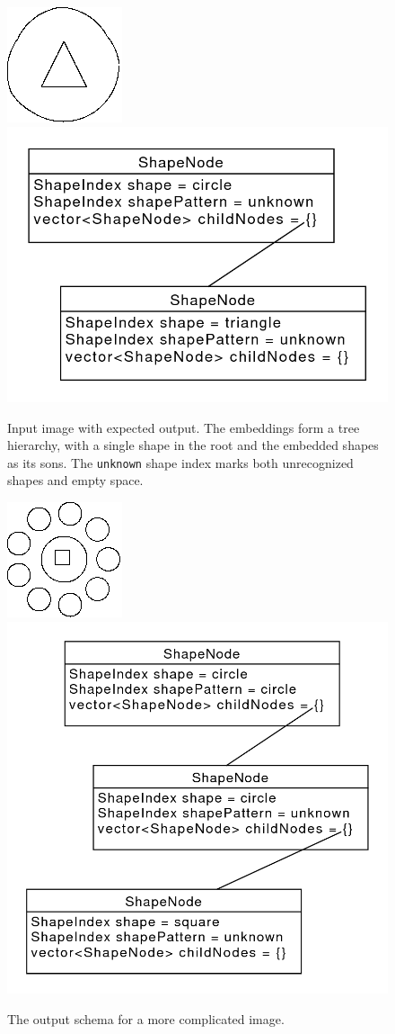 \begin{description}
\begin{figure}[p]
\centering
\includegraphics[width=.3\linewidth]{ext/images/example_output0.png}
\quad
\includegraphics[width=.3\linewidth]{ext/images/example_output0a.png}
\caption{Input image with expected output. The embeddings form a tree hierarchy, with a single shape in the root and the embedded shapes as its sons. The \texttt{unknown} shape index marks both unrecognized shapes and empty space.}
\label{fig:output0}
\end{figure}

\begin{figure}[p]
\centering
\includegraphics[width=.3\linewidth]{ext/images/example_output1.png}
\quad
\includegraphics[width=.3\linewidth]{ext/images/example_output1a.png}
\caption{The output schema for a more complicated image. }
\label{fig:output1}
\end{figure}


\end{description}

